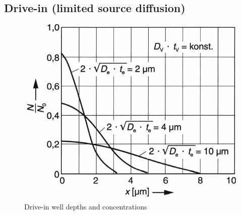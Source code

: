\subsection{Drive-in (limited source diffusion)}
\begin{figure}[H]
	\centering
	\includegraphics[scale=0.5]{dopants_drive_in_depth.png}
	\caption{Drive-in well depths and concentrations}
\end{figure}
